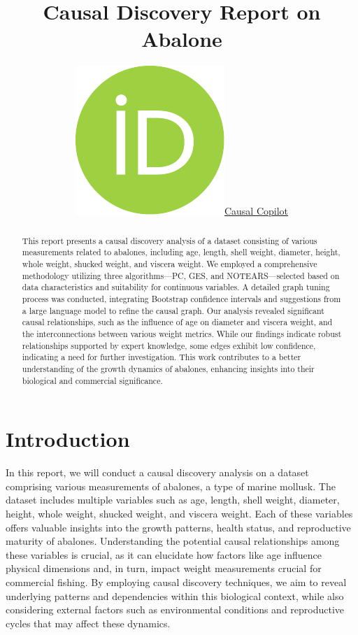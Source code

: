 \documentclass{article}
\title{Causal Discovery Report on Abalone}
\author{ \href{https://orcid.org/0000-0000-0000-0000}{\includegraphics[scale=0.06]{postprocess/context/orcid.pdf}\hspace{1mm}Causal Copilot}}
\begin{document}
\maketitle

\begin{abstract}
This report presents a causal discovery analysis of a dataset consisting of various measurements related to abalones, including age, length, shell weight, diameter, height, whole weight, shucked weight, and viscera weight. We employed a comprehensive methodology utilizing three algorithms—PC, GES, and NOTEARS—selected based on data characteristics and suitability for continuous variables. A detailed graph tuning process was conducted, integrating Bootstrap confidence intervals and suggestions from a large language model to refine the causal graph. Our analysis revealed significant causal relationships, such as the influence of age on diameter and viscera weight, and the interconnections between various weight metrics. While our findings indicate robust relationships supported by expert knowledge, some edges exhibit low confidence, indicating a need for further investigation. This work contributes to a better understanding of the growth dynamics of abalones, enhancing insights into their biological and commercial significance.
\end{abstract}


\raggedbottom
\section{Introduction}
In this report, we will conduct a causal discovery analysis on a dataset comprising various measurements of abalones, a type of marine mollusk. The dataset includes multiple variables such as age, length, shell weight, diameter, height, whole weight, shucked weight, and viscera weight. Each of these variables offers valuable insights into the growth patterns, health status, and reproductive maturity of abalones. Understanding the potential causal relationships among these variables is crucial, as it can elucidate how factors like age influence physical dimensions and, in turn, impact weight measurements crucial for commercial fishing. By employing causal discovery techniques, we aim to reveal underlying patterns and dependencies within this biological context, while also considering external factors such as environmental conditions and reproductive cycles that may affect these dynamics.
\end{document}
